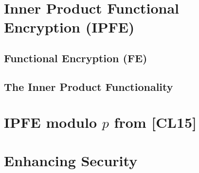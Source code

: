 \documentclass[10pt]{beamer}
\begin{document}
%

%

%

%


\section{Inner Product Functional Encryption (IPFE)}
\subsection{Functional Encryption (FE)}












\subsection{The Inner Product Functionality}





\section{IPFE modulo \texorpdfstring{$p$}{p} from [CL15]}








\section{Enhancing Security}

\end{document}
